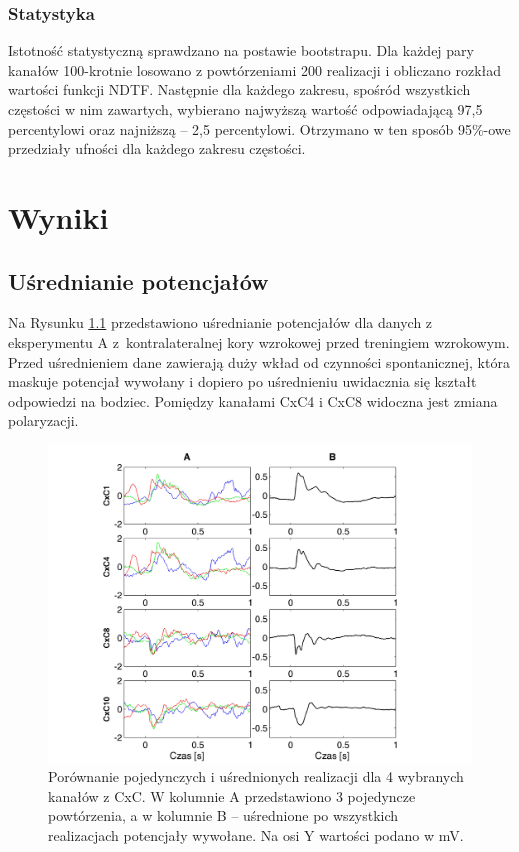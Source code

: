 \documentclass{pracamgr}
\begin{document}
	\subsection{Statystyka}\label{NDTF}
	Istotność statystyczną sprawdzano na postawie bootstrapu. Dla każdej pary kanałów 100-krotnie losowano z powtórzeniami 200 realizacji i obliczano rozkład wartości funkcji NDTF. Następnie dla każdego zakresu, spośród wszystkich częstości w nim zawartych, wybierano najwyższą wartość odpowiadającą 97,5 percentylowi oraz najniższą -- 2,5 percentylowi. Otrzymano w ten sposób 95\%-owe przedziały ufności dla każdego zakresu częstości.
	\chapter{Wyniki}
	\section{Uśrednianie potencjałów}
	Na Rysunku \ref{rys:usrednione_CxC} przedstawiono uśrednianie potencjałów dla danych z eksperymentu A z~kontralateralnej kory wzrokowej przed treningiem wzrokowym. Przed uśrednieniem dane zawierają duży wkład od czynności spontanicznej, która maskuje potencjał wywołany i dopiero po uśrednieniu uwidacznia się kształt odpowiedzi na bodziec. Pomiędzy kanałami CxC4 i CxC8 widoczna jest zmiana polaryzacji.
	\begin{figure}[htbp]
		\begin{center}
			\includegraphics[scale=0.65]{usrednione_CxC.png}
		\end{center}
		\caption{Porównanie pojedynczych i uśrednionych realizacji dla 4 wybranych kanałów z CxC. W kolumnie A przedstawiono 3 pojedyncze powtórzenia, a w kolumnie B -- uśrednione po wszystkich realizacjach potencjały wywołane. Na osi Y wartości podano w mV.}
		\label{rys:usrednione_CxC}
	\end{figure}
	\FloatBarrier
\end{document}
